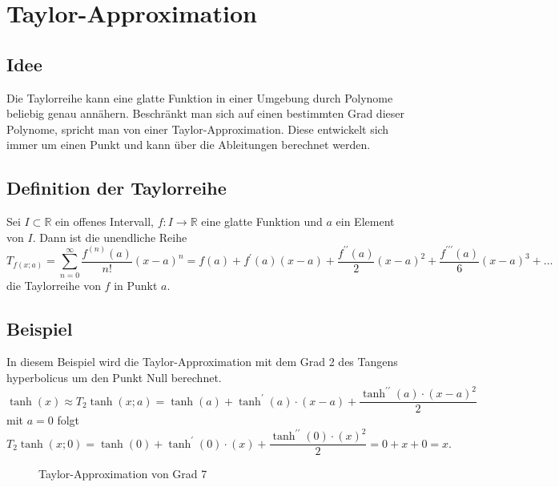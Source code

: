 %
%
%
\section{Taylor-Approximation
\label{transfer:section:teil1}}
\subsection{Idee}
Die Taylorreihe kann eine glatte Funktion in einer Umgebung durch
Polynome beliebig genau annähern. Beschränkt man sich auf einen
bestimmten Grad dieser Polynome, spricht man von einer
Taylor-Approximation. Diese entwickelt sich immer um einen Punkt
und kann über die Ableitungen berechnet werden.

\subsection{Definition der Taylorreihe}
Sei $I \subset \mathbb{R}$ ein offenes Intervall, $f: I \rightarrow
\mathbb{R}$ eine glatte Funktion und $a$ ein Element von $I$. Dann
ist die unendliche Reihe
\begin{equation}
	T_{f(x ; a)}=\sum_{n=0}^{\infty} \frac{f^{(n)}(a)}{n !}(x-a)^{n}=f(a)+f^{\prime}(a)(x-a)+\frac{f^{\prime \prime}(a)}{2}(x-a)^{2}+\frac{f^{\prime \prime \prime}(a)}{6}(x-a)^{3}+\ldots
\end{equation}
die Taylorreihe von $f$ in Punkt $a$.

\subsection{Beispiel}
In diesem Beispiel wird die Taylor-Approximation mit dem Grad 2 des
Tangens hyperbolicus um den Punkt Null berechnet.
\[
	\tanh(x) \approx T_{2} \tanh(x ; a)=\tanh(a)+\tanh^{\prime}(a) \cdot(x-a)+\frac{\tanh^{\prime \prime}(a) \cdot(x-a)^{2}}{2}
\]
mit $a = 0$ folgt
\[
	T_{2} \tanh(x ; 0)=\tanh(0)+\tanh^{\prime}(0) \cdot(x)+\frac{\tanh^{\prime \prime}(0) \cdot(x)^{2}}{2} = 0 + x + 0 = x.
\]
\begin{figure}
\centering
{}
\caption{Taylor-Approximation von Grad 7
\label{motivation:figure:Taylor}}
\end{figure}

